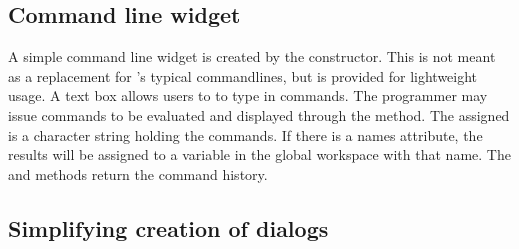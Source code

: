 




\subsection{Command line widget}
\label{sec:gWidgets-command-line-widget}

A simple command line widget is created by the
 constructor. This is not meant as a
replacement for \R's typical commandlines, but is provided for
lightweight usage. A text box allows users to to type in \R\/
commands. The programmer may issue commands to be evaluated and
displayed through the  method. The
 assigned is a character string holding the commands. If
there is a names attribute, the results will be assigned to a variable
in the global workspace with that name. The  and \code{[}
methods return the command history.

\subsection{Simplifying creation of dialogs}
\label{sec:gWidgets-designing-forms}

